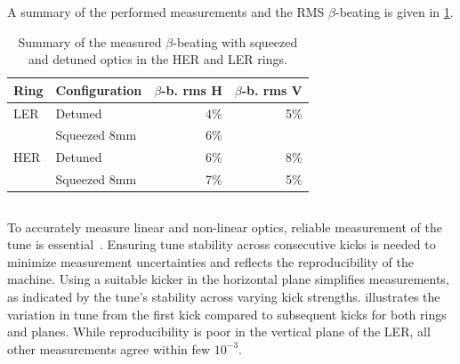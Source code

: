 A summary of the performed measurements and the RMS $\beta$-beating is given in
\cref{tab:kek:summary_beating}.

\begin{table}
    \centering
    \begin{tabular}{llrr}
        \toprule
        Ring & Configuration & $\beta$-b. rms H & $\beta$-b. rms V \\
        \midrule
        LER  &  Detuned      & 4\%              & 5\%   \\
            &  Squeezed 8mm & 6\%              &       \\
        HER  &  Detuned      & 6\%              & 8\%  \\
            &  Squeezed 8mm & 7\%              & 5\%  \\
        \bottomrule
    \end{tabular}
    \caption{Summary of the measured $\beta$-beating with squeezed and detuned optics in the HER
    and LER rings.}
    \label{tab:kek:summary_beating}
\end{table}



\FloatBarrier
\subsection{}

\FloatBarrier
\subsubsection{}

To accurately measure linear and non-linear optics, reliable measurement of the tune is
essential~\cite{thrane_measuring_2020}. Ensuring tune stability across consecutive kicks is needed
to minimize measurement uncertainties and reflects the reproducibility of the machine. Using a
suitable kicker in the horizontal plane simplifies measurements, as indicated by the tune's 
stability across varying kick strengths.  illustrates the variation in tune
from the first kick compared to subsequent kicks for both rings and planes.
While reproducibility is poor in the vertical plane of the LER, all other measurements agree within
few $10^{-3}$.

